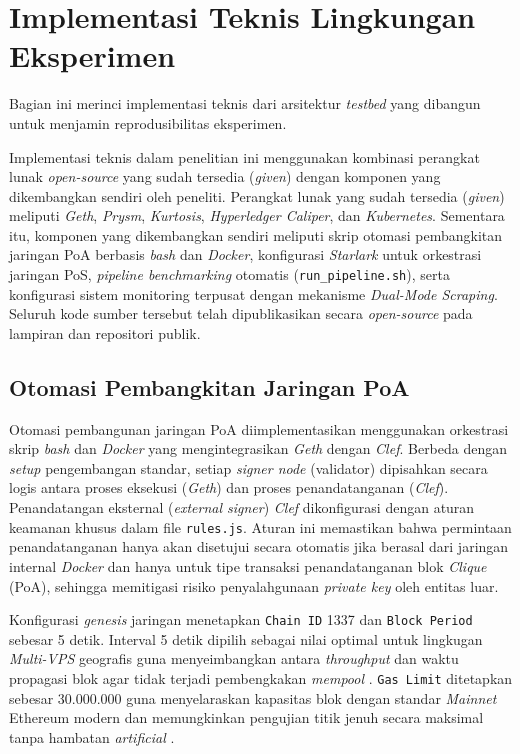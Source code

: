 \section{Implementasi Teknis Lingkungan Eksperimen}

Bagian ini merinci implementasi teknis dari arsitektur \textit{testbed} yang dibangun untuk menjamin reprodusibilitas eksperimen.

Implementasi teknis dalam penelitian ini menggunakan kombinasi perangkat lunak \textit{open-source} yang sudah tersedia (\textit{given}) dengan komponen yang dikembangkan sendiri oleh peneliti. Perangkat lunak yang sudah tersedia (\textit{given}) meliputi \textit{Geth}, \textit{Prysm}, \textit{Kurtosis}, \textit{Hyperledger Caliper}, dan \textit{Kubernetes}. Sementara itu, komponen yang dikembangkan sendiri meliputi skrip otomasi pembangkitan jaringan PoA berbasis \textit{bash} dan \textit{Docker}, konfigurasi \textit{Starlark} untuk orkestrasi jaringan PoS, \textit{pipeline benchmarking} otomatis (\texttt{run\_pipeline.sh}), serta konfigurasi sistem monitoring terpusat dengan mekanisme \textit{Dual-Mode Scraping}. Seluruh kode sumber tersebut telah dipublikasikan secara \textit{open-source} pada lampiran dan repositori publik.

\subsection{Otomasi Pembangkitan Jaringan PoA}
Otomasi pembangunan jaringan PoA diimplementasikan menggunakan orkestrasi skrip \textit{bash} dan \textit{Docker} yang mengintegrasikan \textit{Geth} dengan \textit{Clef}. Berbeda dengan \textit{setup} pengembangan standar, setiap \textit{signer node} (validator) dipisahkan secara logis antara proses eksekusi (\textit{Geth}) dan proses penandatanganan (\textit{Clef}). Penandatangan eksternal (\textit{external signer}) \textit{Clef} dikonfigurasi dengan aturan keamanan khusus dalam file \texttt{rules.js}. Aturan ini memastikan bahwa permintaan penandatanganan hanya akan disetujui secara otomatis jika berasal dari jaringan internal \textit{Docker} dan hanya untuk tipe transaksi penandatanganan blok \textit{Clique} (PoA), sehingga memitigasi risiko penyalahgunaan \textit{private key} oleh entitas luar. 

Konfigurasi \textit{genesis} jaringan menetapkan \texttt{Chain ID} 1337 dan \texttt{Block Period} sebesar 5 detik. Interval 5 detik dipilih sebagai nilai optimal untuk lingkugan \textit{Multi-VPS} geografis guna menyeimbangkan antara \textit{throughput} dan waktu propagasi blok agar tidak terjadi pembengkakan \textit{mempool} \cite{saltini2019}. \texttt{Gas Limit} ditetapkan sebesar 30.000.000 guna menyelaraskan kapasitas blok dengan standar \textit{Mainnet} Ethereum modern dan memungkinkan pengujian titik jenuh secara maksimal tanpa hambatan \textit{artificial} \cite{roughgarden2020, Repo-Gen-PoA}.

